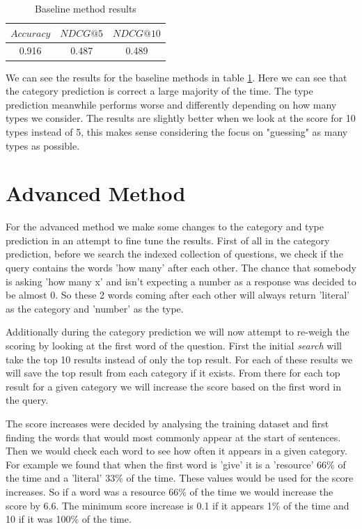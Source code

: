 \documentclass[sigconf]{acmart}
\begin{document}
\begin{table}[h]
    \centering
    \caption{Baseline method results}
    \begin{tabular}{c|c|c}
    $Accuracy$ & $NDCG@5$ & $NDCG@10$ \\
    \hline
    0.916 & 0.487 & 0.489
    \end{tabular}
    \label{tab:baseline_res}
\end{table}

We can see the results for the baseline methods in table \ref{tab:baseline_res}. Here we can see that the category prediction is correct a large majority of the time. The type prediction meanwhile performs worse and differently depending on how many types we consider. The results are slightly better when we look at the score for 10 types instead of 5, this makes sense considering the focus on "guessing" as many types as possible.

\section{Advanced Method}
For the advanced method we make some changes to the category and type prediction in an attempt to fine tune the results. First of all in the category prediction, before we search the indexed collection of questions, we check if the query contains the words 'how many' after each other. The chance that somebody is asking 'how many x' and isn't expecting a number as a response was decided to be almost 0. So these 2 words coming after each other will always return 'literal' as the category and 'number' as the type. 

Additionally during the category prediction we will now attempt to re-weigh the scoring by looking at the first word of the question. First the initial \emph{search} will take the top 10 results instead of only the top result. For each of these results we will save the top result from each category if it exists. From there for each top result for a given category we will increase the score based on the first word in the query. 

The score increases were decided by analysing the training dataset and first finding the words that would most commonly appear at the start of sentences. Then we would check each word to see how often it appears in a given category. For example we found that when the first word is 'give' it is a 'resource' 66\% of the time and a 'literal' 33\% of the time. These values would be used for the score increases. So if a word was a resource 66\% of the time we would increase the score by $6.6$. The minimum score increase is 0.1 if it appears 1\% of the time and 10 if it was 100\% of the time. 
\end{document}
